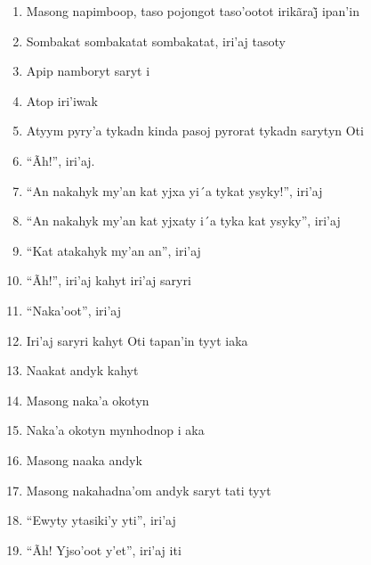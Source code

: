 \begin{enumerate}
 \begin{center}\end{center}

 \item Masong napimboop, taso pojongot taso’ootot irikãraj̃ ipan’in

 \item Sombakat sombakatat sombakatat, iri'aj tasoty

 \item Apip namboryt saryt i

 \item Atop iri'iwak

 \item Atyym pyry'a tykadn kinda pasoj pyrorat tykadn sarytyn Oti

 \begin{center}\end{center}

 \item ``Ãh!'', iri'aj.

 \item ``An nakahyk my'an kat yjxa yi´a tykat ysyky!'', iri'aj

 \item ``An nakahyk my'an kat yjxaty i´a tyka kat ysyky'', iri'aj

 \item ``Kat atakahyk my'an an'', iri'aj

 \item ``Ãh!'', iri'aj kahyt iri'aj saryri

 \item ``Naka'oot'', iri'aj

 \item Iri'aj saryri kahyt Oti tapan'in tyyt iaka

 \item Naakat andyk kahyt

 \item Masong naka'a okotyn

 \item Naka'a okotyn mynhodnop i aka

 \item Masong naaka andyk

 \item Masong nakahadna'om andyk saryt tati tyyt

 \item ``Ewyty ytasiki'y yti'', iri'aj

 \item ``Ãh! Yjso'oot y'et'', iri'aj iti


\end{enumerate}

